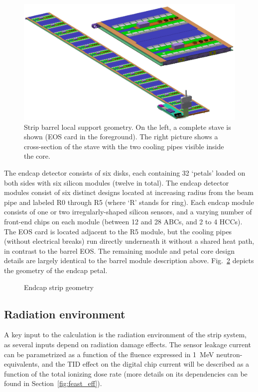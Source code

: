 \begin{figure}[ht]
\centering
\includegraphics[width=0.8\linewidth]{figures/stave.pdf}
\caption{Strip barrel local support geometry. On the left, a complete stave is shown (EOS card in the foreground). The right picture shows a cross-section of the stave with the two cooling pipes visible inside the core. }
\label{fig:barrelgeometry}
\end{figure}

The endcap detector consists of six disks, each containing 32 `petals' loaded on
both sides with six silicon modules (twelve in total).
The endcap detector modules consist of six distinct designs located at increasing radius from the
beam pipe and labeled R0 through R5 (where `R' stands for ring). Each endcap module consists of one
or two irregularly-shaped silicon sensors, and a varying number of front-end chips on each module
(between 12 and 28 ABCs, and 2 to 4 HCCs). The EOS card is located adjacent to the R5 module, but the
cooling pipes (without electrical breaks) run directly underneath it without a shared heat path, in contrast to the barrel EOS.
The remaining module and petal core design details are largely identical to the barrel module description above.
Fig.~\ref{fig:endcapgeometry} depicts the geometry of the endcap petal.

\begin{figure}[ht]
\centering
\caption{Endcap strip geometry}
\label{fig:endcapgeometry}
\end{figure}

\subsection{Radiation environment}
A key input to the calculation is the radiation environment of the strip system, as several inputs depend on radiation damage effects. The sensor leakage current can be parametrized as  a function of the fluence expressed in 1~MeV neutron-equivalents, and the TID effect on the digital chip current will be described as a function of the total ionizing dose rate (more details on its dependencies can be found in Section~\ref{fig:feast_eff}). 

